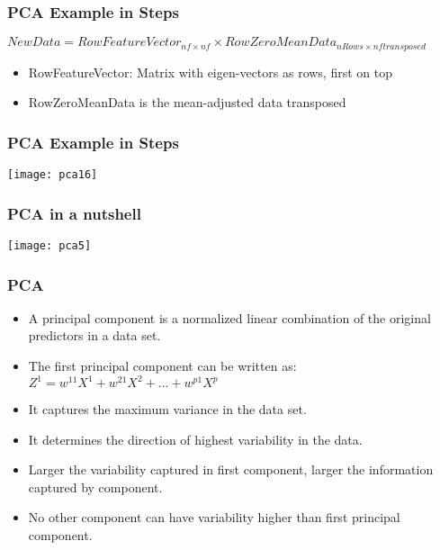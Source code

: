 \begin{frame}[fragile] \frametitle{PCA Example in Steps} 
$NewData = RowFeatureVector_{nf \times nf} \times RowZeroMeanData_{nRows \times nf transposed}$
\begin{itemize}
\item RowFeatureVector: Matrix with eigen-vectors as rows, first on top
\item RowZeroMeanData is the mean-adjusted data transposed
\end{itemize}
\end{frame}

\begin{frame}[fragile] \frametitle{PCA Example in Steps} 
\begin{center}
\texttt{[image: pca16]}
\end{center}
\end{frame}



\begin{frame}[fragile] \frametitle{PCA in a nutshell} 
\begin{center}
\texttt{[image: pca5]}
\end{center}
\end{frame}




\begin{frame}[fragile] \frametitle{PCA} 

\begin{itemize}
\item A principal component is a normalized linear combination of the original predictors in a data set.
\item The first principal component can be written as:
$Z^1 = w^{11}X^1 + w^{21}X^2 + \ldots +  w^{p1}X^p$
\item It captures the maximum variance in the data set. 
\item It determines the direction of highest variability in the data. 
\item Larger the variability captured in first component, larger the information captured by component. 
\item No other component can have variability higher than first principal component.
\end{itemize}
\end{frame}

